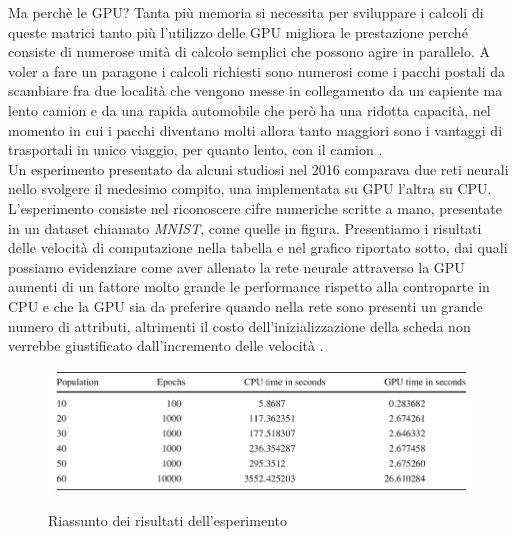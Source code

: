 Ma perchè le GPU? Tanta più memoria si necessita per sviluppare i calcoli di queste matrici tanto più l'utilizzo delle GPU migliora le prestazione perché consiste di numerose unità di calcolo semplici che possono agire in parallelo. A voler a fare un paragone i calcoli richiesti sono numerosi come i pacchi postali da scambiare fra due località che vengono messe in collegamento da un capiente ma lento camion e da una rapida automobile che però ha una ridotta capacità, nel momento in cui i pacchi diventano molti allora tanto maggiori sono i vantaggi di trasportali in unico viaggio, per quanto lento, con il camion \cite{quora:why_gpu}.
\\
Un esperimento presentato da alcuni studiosi nel 2016 comparava due reti neurali nello svolgere il medesimo compito, una implementata su GPU l'altra su CPU. L'esperimento consiste nel riconoscere cifre numeriche scritte a mano, presentate in un dataset chiamato \textit{MNIST}, come quelle in figura. Presentiamo i risultati delle velocità di computazione nella tabella e nel grafico riportato sotto, dai quali possiamo evidenziare come aver allenato la rete neurale attraverso la GPU aumenti di un fattore molto grande le performance rispetto alla controparte in CPU e che la GPU sia da preferire quando nella rete sono presenti un grande numero di attributi, altrimenti il costo dell'inizializzazione della scheda non verrebbe giustificato dall'incremento delle velocità \cite{brito2016gpu}.

\begin{figure}[t]
\centering
{\includegraphics[scale=0.65]{media_tesi/table_experiment.png}}
\caption{Riassunto dei risultati dell'esperimento \cite{brito2016gpu}}
\label{fig:subfig}
\end{figure}

